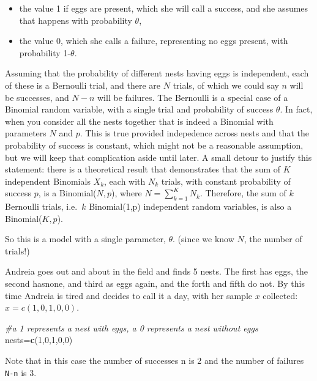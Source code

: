 \documentclass[
]{book}
\newenvironment{Shaded}{\begin{snugshade}}{\end{snugshade}}
\newcommand{\CommentTok}[1]{\textcolor[rgb]{0.56,0.35,0.01}{\textit{#1}}}
\newcommand{\DecValTok}[1]{\textcolor[rgb]{0.00,0.00,0.81}{#1}}
\newcommand{\FunctionTok}[1]{\textcolor[rgb]{0.13,0.29,0.53}{\textbf{#1}}}
\newcommand{\NormalTok}[1]{#1}
\newcommand{\OtherTok}[1]{\textcolor[rgb]{0.56,0.35,0.01}{#1}}
\providecommand{\tightlist}{%
  \setlength{\itemsep}{0pt}\setlength{\parskip}{0pt}}
\begin{document}
\begin{itemize}
\tightlist
\item
  the value 1 if eggs are present, which she will call a success, and she assumes that happens with probability \(\theta\),
\item
  the value 0, which she calls a failure, representing no eggs present, with probability 1-\(\theta\).
\end{itemize}

Assuming that the probability of different nests having eggs is independent, each of these is a Bernoulli trial, and there are \(N\) trials, of which we could say \(n\) will be successes, and \(N-n\) will be failures. The Bernoulli is a special case of a Binomial random variable, with a single trial and probability of success \(\theta\). In fact, when you consider all the nests together that is indeed a Binomial with parameters \(N\) and \(p\). This is true provided indepedence across nests and that the probability of success is constant, which might not be a reasonable assumption, but we will keep that complication aside until later. A small detour to justify this statement: there is a theoretical result that demonstrates that the sum of \(K\) independent Binomials \(X_k\), each with \(N_k\) trials, with constant probability of success \(p\), is a Binomial(\(N,p\)), where \(N=\sum_{k=1}^K N_k\). Therefore, the sum of \(k\) Bernoulli trials, i.e.~\(k\) Binomial(1,p) independent random variables, is also a Binomial(\(K,p\)).

So this is a model with a single parameter, \(\theta\). (since we know \(N\), the number of trials!)

Andreia goes out and about in the field and finds 5 nests. The first has eggs, the second hasnone, and third as eggs again, and the forth and fifth do not. By this time Andreia is tired and decides to call it a day, with her sample \(x\) collected: \(x=c(1,0,1,0,0)\).

\begin{Shaded}
\begin{Highlighting}[]
\CommentTok{\#a 1 represents a nest with eggs, a 0 represents a nest without eggs}
\NormalTok{nests}\OtherTok{=}\FunctionTok{c}\NormalTok{(}\DecValTok{1}\NormalTok{,}\DecValTok{0}\NormalTok{,}\DecValTok{1}\NormalTok{,}\DecValTok{0}\NormalTok{,}\DecValTok{0}\NormalTok{)}
\end{Highlighting}
\end{Shaded}

Note that in this case the number of successes n is 2 and the number of failures \texttt{N-n} is 3.
\end{document}
